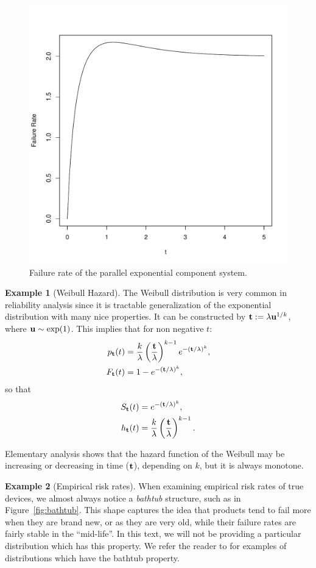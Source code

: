 \documentclass[12pt,a4paper]{report}
\theoremstyle{plain}
\theoremstyle{definition}
\newtheorem{example}{Example}
\begin{document}
\begin{figure}[ht]
\centering
\includegraphics[width=0.5\linewidth]{art/hazard}
\caption{Failure rate of the parallel exponential component system.}
\label{fig:hazard_non_monotone}
\end{figure}





\begin{example}[Weibull Hazard]
The Weibull distribution is very common in reliability analysis since it is tractable generalization of the exponential distribution with many nice properties. 
It can be constructed by 
$\mathbf{t} := \lambda \mathbf{u}^{1/k}$, where $\mathbf{u} \sim \exp(1)$. 
This implies that for non negative $t$:
\begin{align}
	p_{\mathbf{t}} (t) &= \frac{k}{\lambda}\left(\frac{\mathbf{t}}{\lambda} \right)^{k-1} e^{-(\mathbf{t}/\lambda)^k}, \\
	F_{\mathbf{t}} (t) &= 1 - e^{-(\mathbf{t}/\lambda)^k},
\end{align}
so that 
\begin{align}
	S_{\mathbf{t}} (t) &= e^ {-(\mathbf{t}/\lambda )^k}, \\
	h_{\mathbf{t}} (t) &= \frac{k}{\lambda} \left(\frac{\mathbf{t}}{\lambda} \right)^{k-1} .
\end{align}
\end{example}
Elementary analysis shows that the hazard function of the Weibull may be increasing or decreasing in time ($\mathbf{t}$), depending on $k$, but it is always monotone.




\begin{example}[Empirical risk rates]
When examining empirical risk rates of true devices, we almost always notice a \emph{bathtub} structure, such as in Figure~\ref{fig:bathtub}.
This shape captures the idea that products tend to fail more when they are brand new, or as they are very old, while their failure rates are fairly stable in the ``mid-life''.
In this text, we will not be providing a particular distribution which has this property. 
We refer the reader to \cite{nadarajah_bathtub-shaped_2008} for examples of distributions which have the bathtub property.
\end{example}
\end{document}
